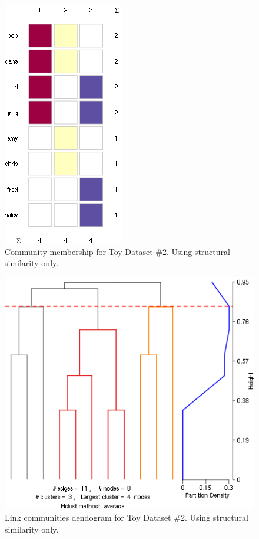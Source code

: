 \documentclass{report} %
\begin{document}

\begin{figure}[htp!]
  \centering
  \includegraphics[width=0.3\linewidth]{toy3/no_ea/top20.png}
  \caption{Community membership for Toy Dataset \#2. Using structural similarity only.}
\end{figure}

\begin{figure}[htp!]
  \centering
  \includegraphics[width=0.6\linewidth]{toy3/no_ea/lc.png}
  \caption{Link communities dendogram for Toy Dataset \#2. Using structural similarity only.}
\end{figure}
\end{document}
